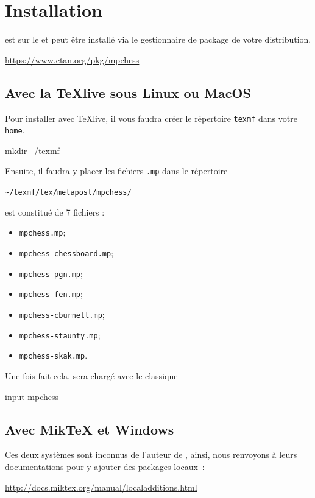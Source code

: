 \documentclass[french]{ltxdoc}
\begin{document}
\section{Installation}

\mpchess est sur le \ctan{} et peut être installé via le gestionnaire de package
de votre distribution.

\begin{center}
  \url{https://www.ctan.org/pkg/mpchess}
\end{center}


\subsection{Avec la \TeX live sous Linux ou MacOS}

Pour installer \mpchess avec \TeX live, il vous faudra créer le répertoire
\lstinline+texmf+ dans votre \lstinline+home+.

\begin{commandshell}
mkdir ~/texmf
\end{commandshell}

Ensuite, il faudra y placer les fichiers \lstinline+.mp+ dans le répertoire \begin{center}
  \lstinline+~/texmf/tex/metapost/mpchess/+
\end{center}

\mpchess est constitué de 7 fichiers  :
\begin{itemize}
  \item \verb+mpchess.mp+;
  \item \verb+mpchess-chessboard.mp+;
  \item \verb+mpchess-pgn.mp+;
  \item \verb+mpchess-fen.mp+;
  \item \verb+mpchess-cburnett.mp+;
  \item \verb+mpchess-staunty.mp+;
  \item \verb+mpchess-skak.mp+.
\end{itemize}

Une fois fait cela, \mpchess sera chargé avec le classique
\begin{mpcode}
input mpchess
\end{mpcode}

\subsection{Avec Mik\TeX{} et Windows}

Ces deux systèmes sont inconnus de l’auteur de \mpchess, ainsi, nous renvoyons à
leurs documentations pour y ajouter des packages locaux :
\begin{center}
  \url{http://docs.miktex.org/manual/localadditions.html}
\end{center}
\end{document}
